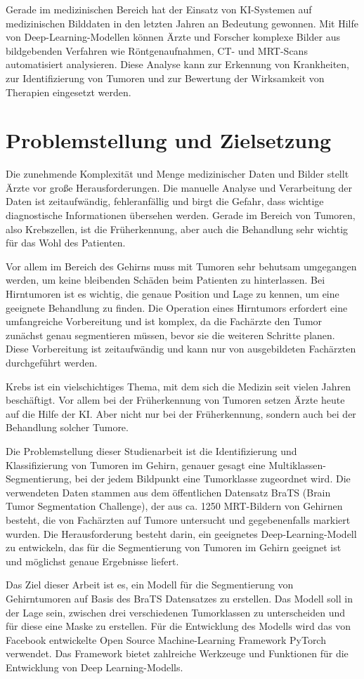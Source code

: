 Gerade im medizinischen Bereich hat der Einsatz von \ac{KI}-Systemen auf medizinischen Bilddaten in den letzten Jahren an Bedeutung gewonnen. Mit Hilfe von Deep-Learning-Modellen können Ärzte und Forscher komplexe Bilder aus bildgebenden Verfahren wie Röntgenaufnahmen, CT- und MRT-Scans automatisiert analysieren. Diese Analyse kann zur Erkennung von Krankheiten, zur Identifizierung von Tumoren und zur Bewertung der Wirksamkeit von Therapien eingesetzt werden. 


\section{Problemstellung und Zielsetzung}
Die zunehmende Komplexität und Menge medizinischer Daten und Bilder stellt Ärzte vor große Herausforderungen. Die manuelle Analyse und Verarbeitung der Daten ist zeitaufwändig, fehleranfällig und birgt die Gefahr, dass wichtige diagnostische Informationen übersehen werden.
Gerade im Bereich von Tumoren, also Krebszellen, ist die Früherkennung, aber auch die Behandlung sehr wichtig für das Wohl des Patienten. 

Vor allem im Bereich des Gehirns muss mit Tumoren sehr behutsam umgegangen werden, um keine bleibenden Schäden beim Patienten zu hinterlassen. Bei Hirntumoren ist es wichtig, die genaue Position und Lage zu kennen, um eine geeignete Behandlung zu finden. Die Operation eines Hirntumors erfordert eine umfangreiche Vorbereitung und ist komplex, da die Fachärzte den Tumor zunächst genau segmentieren müssen, bevor sie die weiteren Schritte planen. Diese Vorbereitung ist zeitaufwändig und kann nur von ausgebildeten Fachärzten durchgeführt werden. 

Krebs ist ein vielschichtiges Thema, mit dem sich die Medizin seit vielen Jahren beschäftigt. Vor allem bei der Früherkennung von Tumoren setzen Ärzte heute auf die Hilfe der \ac{KI}. Aber nicht nur bei der Früherkennung, sondern auch bei der Behandlung solcher Tumore.

Die Problemstellung dieser Studienarbeit ist die Identifizierung und Klassifizierung von Tumoren im Gehirn, genauer gesagt eine Multiklassen-Segmentierung, bei der jedem Bildpunkt eine Tumorklasse zugeordnet wird. Die verwendeten Daten stammen aus dem öffentlichen Datensatz BraTS (Brain Tumor Segmentation Challenge), der aus ca. 1250 \ac{MRT}-Bildern von Gehirnen besteht, die von Fachärzten auf Tumore untersucht und gegebenenfalls markiert wurden. Die Herausforderung besteht darin, ein geeignetes Deep-Learning-Modell zu entwickeln, das für die Segmentierung von Tumoren im Gehirn geeignet ist und möglichst genaue Ergebnisse liefert.  

Das Ziel dieser Arbeit ist es, ein \gls{Modell} für die Segmentierung von Gehirntumoren auf Basis des BraTS Datensatzes zu erstellen. Das \gls{Modell} soll in der Lage sein, zwischen drei verschiedenen Tumorklassen zu unterscheiden und für diese eine Maske zu erstellen. Für die Entwicklung des Modells wird das von Facebook entwickelte Open Source Machine-Learning Framework PyTorch verwendet. Das Framework bietet zahlreiche Werkzeuge und Funktionen für die Entwicklung von Deep Learning-\glspl{Modell}. \cite[vgl.][]{PyTorch}